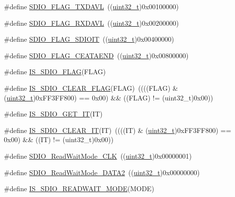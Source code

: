 \begin{DoxyCompactItemize}
$$\item 
\#define \hyperlink{group___s_d_i_o___flags_ga9c6620d6b16b6af19d3e14f40e688631}{S\+D\+I\+O\+\_\+\+F\+L\+A\+G\+\_\+\+T\+X\+D\+A\+VL}~((\hyperlink{_p_e___types_8h_a33594304e786b158f3fb30289278f5af}{uint32\+\_\+t})0x00100000)
\item 
\#define \hyperlink{group___s_d_i_o___flags_ga7558b354658171bb6aa1b6f1e16d8e21}{S\+D\+I\+O\+\_\+\+F\+L\+A\+G\+\_\+\+R\+X\+D\+A\+VL}~((\hyperlink{_p_e___types_8h_a33594304e786b158f3fb30289278f5af}{uint32\+\_\+t})0x00200000)
\item 
\#define \hyperlink{group___s_d_i_o___flags_gae888ec1c9885c35a5f8e01bcffe324a1}{S\+D\+I\+O\+\_\+\+F\+L\+A\+G\+\_\+\+S\+D\+I\+O\+IT}~((\hyperlink{_p_e___types_8h_a33594304e786b158f3fb30289278f5af}{uint32\+\_\+t})0x00400000)
\item 
\#define \hyperlink{group___s_d_i_o___flags_ga3c8d09a405944948e7a1c5493d49aff1}{S\+D\+I\+O\+\_\+\+F\+L\+A\+G\+\_\+\+C\+E\+A\+T\+A\+E\+ND}~((\hyperlink{_p_e___types_8h_a33594304e786b158f3fb30289278f5af}{uint32\+\_\+t})0x00800000)
\item 
\#define \hyperlink{group___s_d_i_o___flags_ga04b3c3c316e112172abacbf5e316f24a}{I\+S\+\_\+\+S\+D\+I\+O\+\_\+\+F\+L\+AG}(F\+L\+AG)
\item 
\#define \hyperlink{group___s_d_i_o___flags_ga8a093bc0b51901676fd5da7087d8ab3a}{I\+S\+\_\+\+S\+D\+I\+O\+\_\+\+C\+L\+E\+A\+R\+\_\+\+F\+L\+AG}(F\+L\+AG)~((((F\+L\+AG) \& (\hyperlink{_p_e___types_8h_a33594304e786b158f3fb30289278f5af}{uint32\+\_\+t})0x\+F\+F3\+F\+F800) == 0x00) \&\& ((\+F\+L\+A\+G) != (uint32\+\_\+t)0x00))
\item 
\#define \hyperlink{group___s_d_i_o___flags_gaef42c81f1f6250d8f9f438f4e16d1e98}{I\+S\+\_\+\+S\+D\+I\+O\+\_\+\+G\+E\+T\+\_\+\+IT}(IT)
\item 
\#define \hyperlink{group___s_d_i_o___flags_gaf829b01d8c3e9a1e4e04d39abdc8c355}{I\+S\+\_\+\+S\+D\+I\+O\+\_\+\+C\+L\+E\+A\+R\+\_\+\+IT}(IT)~((((IT) \& (\hyperlink{_p_e___types_8h_a33594304e786b158f3fb30289278f5af}{uint32\+\_\+t})0x\+F\+F3\+F\+F800) == 0x00) \&\& ((\+I\+T) != (uint32\+\_\+t)0x00))
\item 
\#define \hyperlink{group___s_d_i_o___read___wait___mode_ga5d73b50fed8b2589f337a6301f22f41c}{S\+D\+I\+O\+\_\+\+Read\+Wait\+Mode\+\_\+\+C\+LK}~((\hyperlink{_p_e___types_8h_a33594304e786b158f3fb30289278f5af}{uint32\+\_\+t})0x00000001)
\item 
\#define \hyperlink{group___s_d_i_o___read___wait___mode_ga3d6952d82468b49dcc7abd5b9e02039f}{S\+D\+I\+O\+\_\+\+Read\+Wait\+Mode\+\_\+\+D\+A\+T\+A2}~((\hyperlink{_p_e___types_8h_a33594304e786b158f3fb30289278f5af}{uint32\+\_\+t})0x00000000)
\item 
\#define \hyperlink{group___s_d_i_o___read___wait___mode_ga35144093f5b3553a62c2248896eead4d}{I\+S\+\_\+\+S\+D\+I\+O\+\_\+\+R\+E\+A\+D\+W\+A\+I\+T\+\_\+\+M\+O\+DE}(M\+O\+DE)
\end{DoxyCompactItemize}
